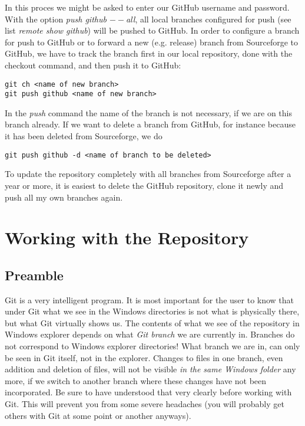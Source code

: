 \documentclass[../Maxima_Workbook.tex]{subfiles}
\begin{document}
In this proces we might be asked to enter our GitHub username and password. With the option \emph{push github $ -- $all}, all local branches configured for push (see list \emph{remote show github}) will be pushed to GitHub. In order to configure a branch for push to GitHub or to forward a new (e.g. release) branch from Sourceforge to GitHub, we have to track the branch first in our local repository, done with the checkout command, and then push it to GitHub:

\begin{lstlisting}[style=smallblue]
git ch <name of new branch>
git push github <name of new branch>
\end{lstlisting}

In the \emph{push} command the name of the branch is not necessary, if we are on this branch already. If we want to delete a branch from GitHub, for instance because it has been deleted from Sourceforge, we do

\begin{lstlisting}[style=smallblue]
git push github -d <name of branch to be deleted> 
\end{lstlisting}

To update the repository completely with all branches from Sourceforge after a year or more, it is easiest to delete the GitHub repository, clone it newly and push all my own branches again.

\section{Working with the Repository}

\subsection{Preamble}

Git is a very intelligent program. It is most important for the user to know that under Git what we see in the Windows directories is not what is physically there, but what Git virtually shows us. The contents of what we see of the repository in Windows explorer depends on what \emph{Git branch} we are currently in. Branches do not correspond to Windows explorer directories! What branch we are in, can only be seen in Git itself, not in the explorer. Changes to files in one branch, even addition and deletion of files, will not be visible \emph{in the same Windows folder} any more, if we switch to another branch where these changes have not been incorporated. Be sure to have understood that very clearly before working with Git. This will prevent you from some severe headaches (you will probably get others with Git at some point or another anyways).
\end{document}
